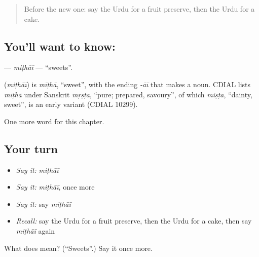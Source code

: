 \label{lesson:UR-C167-mithai}



\begin{quote}
Before the new one: say the Urdu for a fruit preserve, then the Urdu for a cake.
\end{quote}

\subsection*{You'll want to know: }
\textbf{} — \emph{miṭhāī} — \textquotedblleft{}sweets\textquotedblright{}.

\begin{cousinweb}
\textbf{} (\emph{miṭhāī}) is \emph{mīṭhā}, \textquotedblleft{}sweet\textquotedblright{}, with the ending \emph{-āī} that makes a noun. CDIAL lists \emph{mīṭhā} under Sanskrit \emph{mṛṣṭa}, \textquotedblleft{}pure; prepared, savoury\textquotedblright{}, of which \emph{miṣṭa}, \textquotedblleft{}dainty, sweet\textquotedblright{}, is an early variant (CDIAL 10299).
\end{cousinweb}

\begin{grammarlens}[title={What you've built}]
One more word for this chapter.
\end{grammarlens}

\subsection*{Your turn}
\begin{itemize}
\raggedright
  \item \emph{Say it:} \emph{miṭhāī}
  \item \emph{Say it:} \emph{miṭhāī}, once more
  \item \emph{Say it:} say \emph{miṭhāī}
  \item \emph{Recall:} say the Urdu for a fruit preserve, then the Urdu for a cake, then say \emph{miṭhāī} again
\end{itemize}

\begin{tcolorbox}[breakable,colback=teal!4,colframe=teal!35!black,title={Before you move on}]
What does  mean? (\textquotedblleft{}Sweets\textquotedblright{}.) Say it once more.
\end{tcolorbox}
